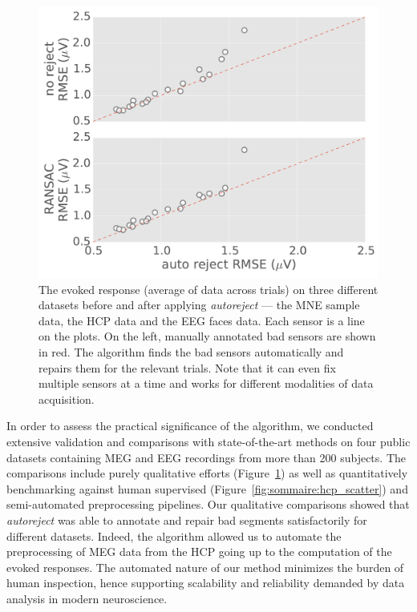 \begin{figure}[htb!]
	\centering
	\includegraphics[width=0.9\linewidth]{figures/figure5.pdf}
    \caption[The evoked response (average of data across trials) on three different datasets before and after applying \emph{autoreject}]{The evoked response (average of data across trials) on three different datasets before and after applying \emph{autoreject} --- the MNE sample data, the HCP data and the EEG faces data. Each sensor is a line on the plots. On the left, manually annotated bad sensors are shown in red. The algorithm finds the bad sensors automatically and repairs them for the relevant trials. Note that it can even fix multiple sensors at a time and works for different modalities of data acquisition.}
    \label{fig:sommaire:sample_evoked}
\end{figure}

In order to assess the practical significance of the algorithm, we conducted extensive validation and comparisons with state-of-the-art methods on four public datasets containing \ac{MEG} and \ac{EEG} recordings from more than 200 subjects. The comparisons include purely qualitative efforts (Figure~\ref{fig:sommaire:sample_evoked}) as well as quantitatively benchmarking against human supervised (Figure~\ref{fig:sommaire:hcp_scatter}) and semi-automated preprocessing pipelines. Our qualitative comparisons showed that \emph{autoreject} was able to annotate and repair bad segments satisfactorily for different datasets. Indeed, the algorithm allowed us to automate the preprocessing of \ac{MEG} data from the \ac{HCP} going up to the computation of the evoked responses. The automated nature of our method minimizes the burden of human inspection, hence supporting scalability and reliability demanded by data analysis in modern neuroscience.

